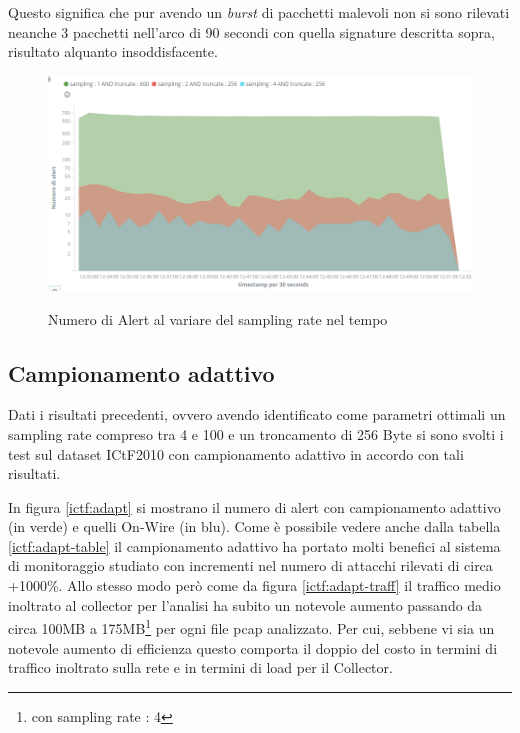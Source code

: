 \documentclass[12pt,a4paper,openright,twoside]{report}
\begin{document}
Questo significa che pur avendo un {\it burst} di pacchetti malevoli non si sono
rilevati neanche 3 pacchetti nell'arco di 90 secondi con quella signature descritta
sopra, risultato alquanto insoddisfacente.

\begin{figure}[h!]
\begin{center}                          %
  \includegraphics[width=\textwidth]{images/CTU-time.png}
  \caption{Numero di Alert al variare del sampling rate nel tempo}\label{ctu:time}
  \label{}
\end{center}
\end{figure}

\clearpage

\subsection{Campionamento adattivo}


Dati i risultati precedenti, ovvero avendo identificato come parametri ottimali
un sampling rate compreso tra 4 e 100 e un troncamento di 256 Byte si sono svolti
i test sul dataset ICtF2010 con campionamento adattivo in accordo con tali risultati.

In figura \ref{ictf:adapt} si mostrano il numero di alert con campionamento adattivo (in verde)
e quelli On-Wire (in blu). Come \`e possibile vedere anche dalla tabella \ref{ictf:adapt-table}
il campionamento adattivo ha portato molti benefici al sistema di monitoraggio studiato con
incrementi nel numero di attacchi rilevati di circa +1000\%. Allo stesso modo per\`o
come da figura \ref{ictf:adapt-traff} il traffico medio inoltrato al collector per l'analisi
ha subito un notevole aumento passando da circa 100MB a 175MB\footnote{con sampling rate : 4} per ogni file pcap analizzato.
Per cui, sebbene vi sia un notevole aumento di efficienza questo comporta il doppio
del costo in termini di traffico inoltrato sulla rete e in termini di load per il
Collector.
\end{document}
